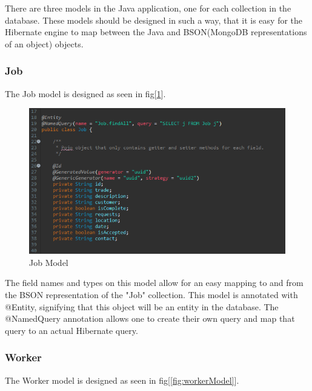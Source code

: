 There are three models in the Java application, one for each collection in the database. These models should be designed in such a way, that it is easy for the Hibernate engine to map between the Java and BSON(MongoDB representations of an object) objects.

\subsubsection{Job}
\label{sec:SystemDesignJob}

The Job model is designed as seen in fig[\ref{fig:jobModel}]. 

\begin{figure}[H]
    \centering
    \includegraphics[width=\textwidth, height=180pt]{DesignImages/JobModel.PNG}
    \caption{Job Model}
    \label{fig:jobModel}
\end{figure}

\bigskip

The field names and types on this model allow for an easy mapping to and from the BSON representation of the "Job" collection. This model is annotated with @Entity, signifying that this object will be an entity in the database. The @NamedQuery annotation allows one to create their own query and map that query to an actual Hibernate query.

\subsubsection{Worker}
\label{sec:SystemDesignWorker}

The Worker model is designed as seen in fig[\ref{fig:workerModel}].

